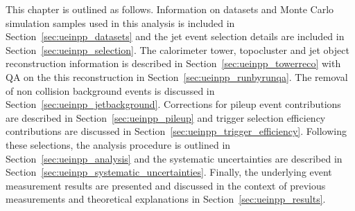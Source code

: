 This chapter is outlined as follows. Information on datasets and Monte Carlo simulation samples used in this analysis is included in Section~\ref{sec:ueinpp_datasets} and the jet event selection details are included in Section~\ref{sec:ueinpp_selection}. The calorimeter tower, topocluster and jet object reconstruction information is described in Section~\ref{sec:ueinpp_towerreco} with QA on the this reconstruction in Section~\ref{sec:ueinpp_runbyrunqa}. The removal of non collision background events is discussed in Section~\ref{sec:ueinpp_jetbackground}. Corrections for pileup event contributions are described in Section~\ref{sec:ueinpp_pileup} and trigger selection efficiency contributions are discussed in Section~\ref{sec:ueinpp_trigger_efficiency}. Following these selections, the analysis procedure is outlined in Section~\ref{sec:ueinpp_analysis} and the systematic uncertainties are described in Section~\ref{sec:ueinpp_systematic_uncertainties}. Finally, the underlying event measurement results are presented and discussed in the context of previous measurements and theoretical explanations in Section~\ref{sec:ueinpp_results}.